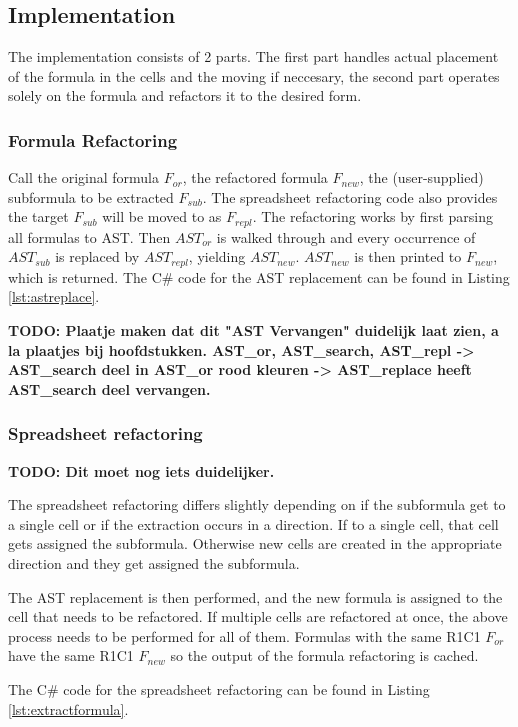 \documentclass[12pt,a4paper,onecolumn,oneside,parskip]{memoir}
\newcommand{\todo}[1]{\textbf{TODO: #1}}
\begin{document}
\subsection{Implementation}

The implementation consists of 2 parts.
The first part handles actual placement of the formula in the cells and the moving if neccesary, the second part operates solely on the formula and refactors it to the desired form.

\subsubsection{Formula Refactoring}
Call the original formula $F_{or}$, the refactored formula $F_{new}$, the (user-supplied) subformula to be extracted $F_{sub}$.
The spreadsheet refactoring code also provides the target $F_{sub}$ will be moved to as $F_{repl}$.
The refactoring works by first parsing all formulas to AST.
Then $AST_{or}$ is walked through and every occurrence of $AST_{sub}$ is replaced by $AST_{repl}$, yielding $AST_{new}$.
$AST_{new}$ is then printed to $F_{new}$, which is returned.
The C\# code for the AST replacement can be found in Listing \ref{lst:astreplace}.

\todo{Plaatje maken dat dit "AST Vervangen" duidelijk laat zien, a la plaatjes bij hoofdstukken.
AST_or, AST_search, AST_repl -> AST_search deel in AST_or rood kleuren -> AST_replace heeft AST_search deel vervangen.
}

\subsubsection{Spreadsheet refactoring}

\todo{Dit moet nog iets duidelijker.}

The spreadsheet refactoring differs slightly depending on if the subformula get to a single cell or if the extraction occurs in a direction.
If to a single cell, that cell gets assigned the subformula.
Otherwise new cells are created in the appropriate direction and they get assigned the subformula.

The AST replacement is then performed, and the new formula is assigned to the cell that needs to be refactored.
If multiple cells are refactored at once, the above process needs to be performed for all of them.
Formulas with the same R1C1 $F_{or}$ have the same R1C1 $F_{new}$ so the output of the formula refactoring is cached.

The C\# code for the spreadsheet refactoring can be found in Listing \ref{lst:extractformula}.
\end{document}
